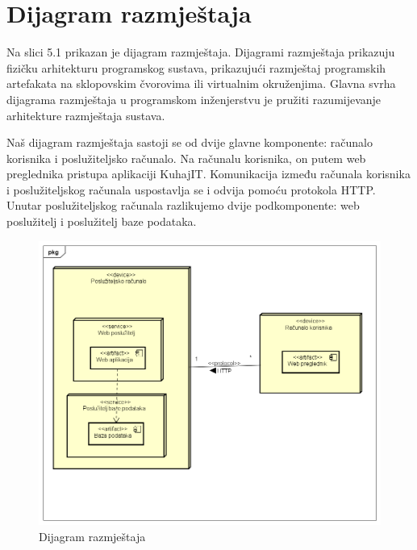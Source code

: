 		
		

















			
			
		
		
		
		\section{Dijagram razmještaja}
			
		
		Na slici 5.1 prikazan je dijagram razmještaja. Dijagrami razmještaja prikazuju fizičku arhitekturu programskog sustava, prikazujući razmještaj programskih artefakata na sklopovskim čvorovima ili virtualnim okruženjima. Glavna svrha dijagrama razmještaja u programskom inženjerstvu je pružiti razumijevanje arhitekture razmještaja sustava.
		
		Naš dijagram razmještaja sastoji se od dvije glavne komponente: računalo korisnika i poslužiteljsko računalo. Na računalu korisnika, on putem web preglednika pristupa aplikaciji KuhajIT. Komunikacija između računala korisnika i poslužiteljskog računala uspostavlja se i odvija pomoću protokola HTTP. Unutar poslužiteljskog računala razlikujemo dvije podkomponente: web poslužitelj i poslužitelj baze podataka.
		
					\begin{figure}[H]
			\includegraphics[scale=0.4]{dijagrami/UML_dijagram_razmjestaja.PNG} %
			\centering
			\caption{Dijagram razmještaja}
			\label{Dijagram razmještaja}
		\end{figure}
		
